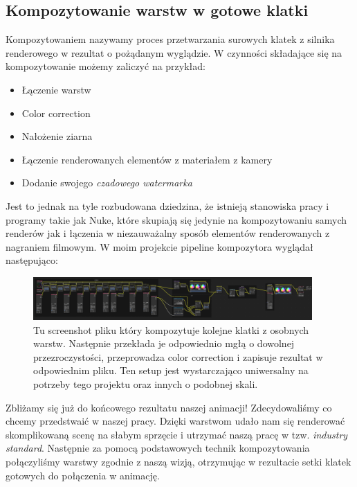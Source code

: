 \subsection{Kompozytowanie warstw w gotowe klatki}
Kompozytowaniem nazywamy proces przetwarzania surowych klatek z silnika renderowego w rezultat o pożądanym wyglądzie. W czynności składające się na kompozytowanie możemy zaliczyć na przykład:
\begin{itemize} %
    \item Łączenie warstw
    \item Color correction
    \item Nałożenie ziarna
    \item Łączenie renderowanych elementów z materiałem z kamery
    \item Dodanie swojego \textit{czadowego watermarka}
\end{itemize}
Jest to jednak na tyle rozbudowana dziedzina, że istnieją stanowiska pracy i programy takie jak Nuke, które skupiają się jedynie na kompozytowaniu samych renderów jak i łączenia w niezauważalny sposób elementów renderowanych z nagraniem filmowym. W moim projekcie pipeline kompozytora wyglądał następująco:
\begin{figure}[hbtp]
    \centering
    \includegraphics[width=0.95\textwidth]{pictures/Tomek/compositing.png}
    \caption[width=0.75\textwidth]{Tu screenshot pliku który kompozytuje kolejne klatki z osobnych warstw. Następnie przekłada je odpowiednio mgłą o dowolnej przezroczystości, przeprowadza color correction i zapisuje rezultat w odpowiednim pliku. Ten setup jest wystarczająco uniwersalny na potrzeby tego projektu oraz innych o podobnej skali.}
    \label{fig:render_comp}
\end{figure}

Zbliżamy się już do końcowego rezultatu naszej animacji! Zdecydowaliśmy co chcemy przedstwaić w naszej pracy. Dzięki warstwom udało nam się renderować skomplikowaną scenę na słabym sprzęcie i utrzymać naszą pracę w tzw. \textit{industry standard}. Następnie za pomocą podstawowych technik kompozytowania połączyliśmy warstwy zgodnie z naszą wizją, otrzymując w rezultacie setki klatek gotowych do połączenia w animację.
\newpage
